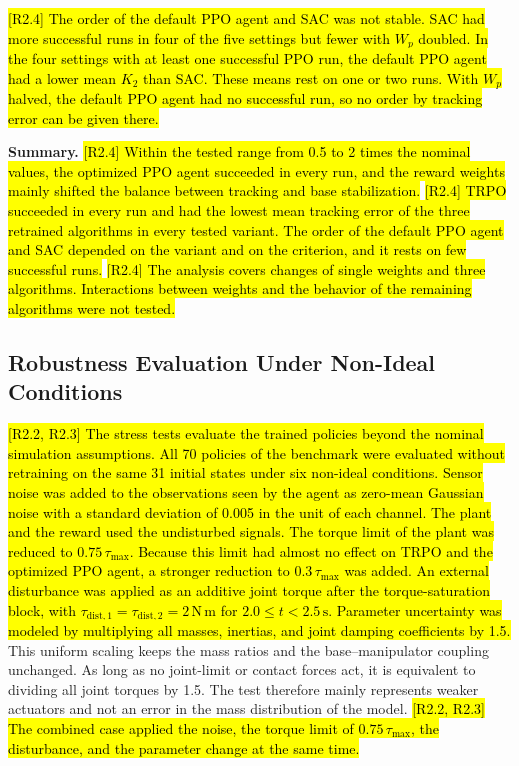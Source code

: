 \documentclass{ieeeaccess}
\newcommand{\hlone}[1]{{\sethlcolor{rone}\hl{#1}}}
\begin{document}
\hlone{[R2.4] The order of the default PPO agent and SAC was not stable. SAC had more successful runs
in four of the five settings but fewer with $W_p$ doubled. In the four settings with at least one
successful PPO run, the default PPO agent had a lower mean $K_2$ than SAC. These means rest on one or two
runs. With $W_p$ halved, the default PPO agent had no successful run, so no order by tracking error can
be given there.}

\textbf{Summary.} \hlone{[R2.4] Within the tested range from 0.5 to 2 times the nominal
values, the optimized PPO agent succeeded in every run, and the reward weights mainly shifted the balance
between tracking and base stabilization.} \hlone{[R2.4] TRPO succeeded in every run and had the
lowest mean tracking error of the three retrained algorithms in every tested variant. The order of the
default PPO agent and SAC depended on the variant and on the criterion, and it rests on few successful
runs.} \hlone{[R2.4] The analysis covers changes of single weights and three algorithms.
Interactions between weights and the behavior of the remaining algorithms were not tested.}

\subsection{Robustness Evaluation Under Non-Ideal Conditions}\label{sec:robustness_eval}
\hlone{[R2.2, R2.3] The stress tests evaluate the trained policies beyond the nominal simulation assumptions. All 70 policies
of the benchmark were evaluated without retraining on the same 31 initial states under six non-ideal
conditions. Sensor noise was added to the observations seen by the agent as zero-mean Gaussian noise with
a standard deviation of 0.005 in the unit of each channel. The plant and the reward used the undisturbed
signals. The torque limit of the plant was reduced to $0.75\,\tau_{\max}$. Because this limit had almost no
effect on TRPO and the optimized PPO agent, a stronger reduction to $0.3\,\tau_{\max}$ was added. An external
disturbance was applied as an additive joint torque after the torque-saturation block, with
$\tau_{\mathrm{dist},1}=\tau_{\mathrm{dist},2}=2\,\mathrm{N\,m}$ for $2.0 \le t < 2.5\,\mathrm{s}$.
Parameter uncertainty was modeled by multiplying all masses, inertias, and joint damping coefficients by
1.5.} This uniform scaling keeps the mass ratios and the base--manipulator coupling
unchanged. As long as no joint-limit or contact forces act, it is equivalent to dividing all joint
torques by 1.5. The test therefore mainly represents weaker actuators and not an error in the mass
distribution of the model. \hlone{[R2.2, R2.3] The combined case applied the noise, the torque limit
of $0.75\,\tau_{\max}$, the disturbance, and the parameter change at the same time.}
\end{document}
